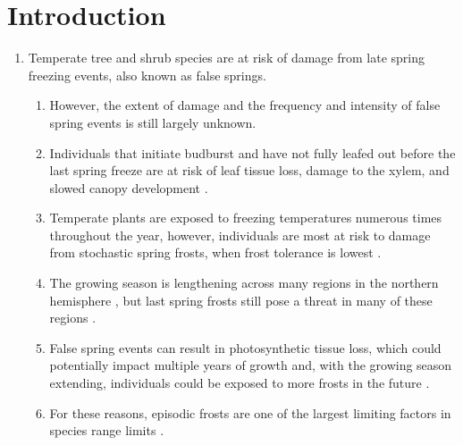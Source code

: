 \documentclass{article}\usepackage[]{graphicx}\usepackage[]{color}
\begin{document}
\section*{Introduction}
\begin{enumerate}
\item Temperate tree and shrub species are at risk of damage from late spring freezing events, also known as false springs.
\begin{enumerate}
\item However, the extent of damage and the frequency and intensity of false spring events is still largely unknown.
\item Individuals that initiate budburst and have not fully leafed out before the last spring freeze are at risk of leaf tissue loss, damage to the xylem, and slowed canopy development \citep{Gu2008, Hufkens2012}.
\item Temperate plants are exposed to freezing temperatures numerous times throughout the year, however, individuals are most at risk to damage from stochastic spring frosts, when frost tolerance is lowest \citep{Sakai1987}.
\item The growing season is lengthening across many regions in the northern hemisphere \citep{Chen2005, Liu2006, Kukal2018}, but last spring frosts still pose a threat in many of these regions \citep{Wypych2016a}.
\item False spring events can result in photosynthetic tissue loss, which could potentially impact multiple years of growth and, with the growing season extending, individuals could be exposed to more frosts in the future \citep{Liu2018}.
\item For these reasons, episodic frosts are one of the largest limiting factors in species range limits \citep{Kollas2014}. 
\end{enumerate}



\end{enumerate}
\end{document}

